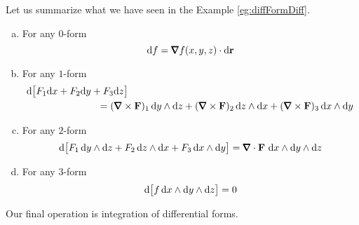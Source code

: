 Let us summarize what we have seen in the Example \ref{eg:diffFormDiff}.
\begin{lemma}\label{lemma:dGradCurlDiv}
\begin{enumerate}[(a)]

\item
For any $0$-form
\begin{equation*}
\dee{f}
=\vnabla f(x,y,z)\cdot\dee{\vr}
\end{equation*}

\item
For any $1$-form
\begin{align*}
&\dee{}\big[F_1\dee{x} + F_2\dee{y} + F_3\dee{z}\big]
\\&\hskip1in
=   (\vnabla\times\vF)_1\,\dee{y}\wedge\dee{z}
   +(\vnabla\times\vF)_2\,\dee{z}\wedge\dee{x}
   +(\vnabla\times\vF)_3\,\dee{x}\wedge\dee{y}
\end{align*}

\item
For any $2$-form
\begin{equation*}
\dee{}\big[F_1\,\dee{y}\wedge\dee{z}
 + F_2\,\dee{z}\wedge\dee{x}
 + F_3\,\dee{x}\wedge\dee{y}\big]
=   \vnabla\cdot\vF\ \dee{x}\wedge\dee{y}\wedge\dee{z}
\end{equation*}

\item
For any $3$-form
\begin{equation*}
\mathrm{d}\big[f\,\mathrm{d}x\wedge\mathrm{d}y\wedge\mathrm{d}z\big]=0
\end{equation*}

\end{enumerate}
\end{lemma}

Our final operation is integration of differential forms.

